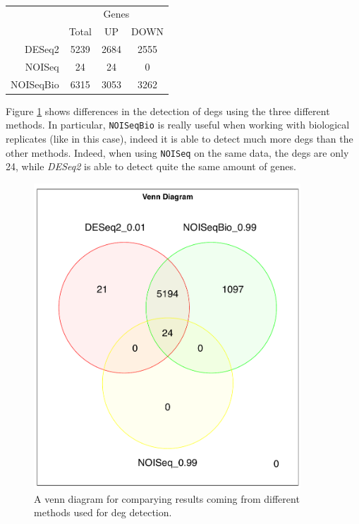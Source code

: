 \begin{table}[H]
\centering
\begin{tabular}{r c c c}
\multicolumn{1}{r}{} & \multicolumn{3}{c}{Genes} \\
\cline{2-4}
\multicolumn{1}{r}{} & Total & UP & DOWN \\
\cline{2-4}
DESeq2 & 5239 & 2684 & 2555 \\
NOISeq & 24 & 24 & 0 \\
NOISeqBio & 6315 & 3053 & 3262 \\
\end{tabular}
\caption[\gls{tic} Single Time Points DE methods results]{}
\label{tab:ticorserderesultstp}
\end{table}

Figure \ref{fig:ticorsertpvenn} shows differences in the detection of \glspl{deg} using the three different methods.
In particular, \lstinline!NOISeqBio! is really useful when working with biological replicates (like in this case), indeed it is able to detect much more \glspl{deg} than the other methods. 
Indeed, when using \lstinline!NOISeq! on the same data, the \glspl{deg} are only 24, while \textit{DESeq2} is able to detect quite the same amount of genes.

\begin{figure}[H]
\includegraphics[width=10cm, keepaspectratio]{img/ticorser/de/singleTP/venn.pdf}
\caption[ticorser venn diagram single time point]{A venn diagram for comparying results coming from different methods used for \gls{deg} detection. }
\label{fig:ticorsertpvenn}
\centering
\end{figure}

